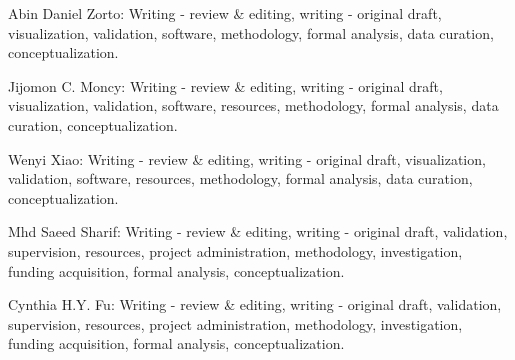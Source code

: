 Abin Daniel Zorto: Writing - review \& editing, writing - original draft, visualization, validation, software, methodology, formal analysis, data curation, conceptualization.

Jijomon C. Moncy: Writing - review \& editing, writing - original draft, visualization, validation, software, resources, methodology, formal analysis, data curation, conceptualization.

Wenyi Xiao: Writing - review \& editing, writing - original draft, visualization, validation, software, resources, methodology, formal analysis, data curation, conceptualization.

Mhd Saeed Sharif: Writing - review \& editing, writing - original draft, validation, supervision, resources, project administration, methodology, investigation, funding acquisition, formal analysis, conceptualization.

Cynthia H.Y. Fu: Writing - review \& editing, writing - original draft, validation, supervision, resources, project administration, methodology, investigation, funding acquisition, formal analysis, conceptualization.
